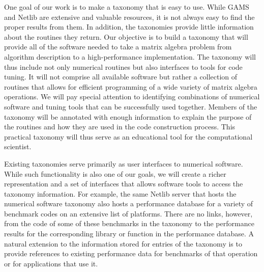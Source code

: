\documentclass{report}
\begin{document}
One goal of our work is to make a taxonomy that is easy to use.
While GAMS and Netlib are extensive and valuable resources, it is not
always easy to find the proper results from them. In addition, the
taxonomies provide little information about the routines they return.
Our objective is to build a taxonomy that will provide all of the
software needed to take a matrix algebra problem from algorithm
description to a high-performance implementation. The taxonomy will
thus include not only numerical routines but also interfaces to tools
for code tuning. It will not comprise all available software but rather
a collection of routines that allows for efficient programming of a wide
variety of matrix algebra operations. We will pay special attention to
identifying combinations of numerical software and tuning tools that can
be successfully used together. Members of the taxonomy will be annotated
with enough information to explain the purpose of the routines and how
they are used in the code construction process. This practical taxonomy
will thus serve as an educational tool for the computational scientist.

Existing taxonomies serve primarily as user interfaces to numerical
software. While such functionality is also one of our goals, we will
create a richer representation and a set of interfaces that allows
software tools to access the taxonomy information. For example, the same
Netlib server that hosts the numerical software taxonomy also hosts a
performance database for a variety of benchmark codes on an extensive
list of platforms. There are no links, however, from the code of some
of these benchmarks in the taxonomy to the performance results for the
corresponding library or function in the performance database. A natural
extension to the information stored for entries of the taxonomy is to
provide references to existing performance data for benchmarks of that
operation or for applications that use it.
\end{document}
